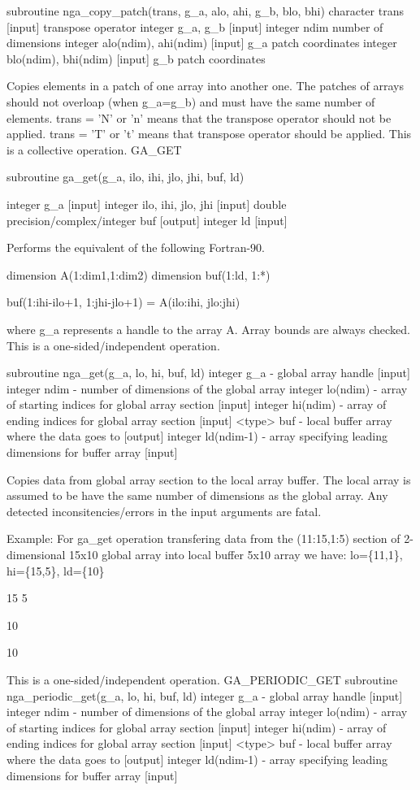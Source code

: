 subroutine nga\_copy\_patch(trans, g\_a, alo, ahi, g\_b, blo, bhi)
character trans {[}input{]} transpose operator integer g\_a, g\_b
{[}input{]} integer ndim number of dimensions integer alo(ndim), ahi(ndim)
{[}input{]} g\_a patch coordinates integer blo(ndim), bhi(ndim) {[}input{]}
g\_b patch coordinates

Copies elements in a patch of one array into another one. The patches
of arrays should not overloap (when g\_a=g\_b) and must have the same
number of elements. trans = 'N' or 'n' means that the transpose operator
should not be applied. trans = 'T' or 't' means that transpose operator
should be applied. This is a collective operation. GA\_GET

subroutine ga\_get(g\_a, ilo, ihi, jlo, jhi, buf, ld)

integer g\_a {[}input{]} integer ilo, ihi, jlo, jhi {[}input{]} double
precision/complex/integer buf {[}output{]} integer ld {[}input{]}

Performs the equivalent of the following Fortran-90.

dimension A(1:dim1,1:dim2) dimension buf(1:ld, 1:{*})

buf(1:ihi-ilo+1, 1:jhi-jlo+1) = A(ilo:ihi, jlo:jhi)

where g\_a represents a handle to the array A. Array bounds are always
checked. This is a one-sided/independent operation.

subroutine nga\_get(g\_a, lo, hi, buf, ld) integer g\_a - global array
handle {[}input{]} integer ndim - number of dimensions of the global
array integer lo(ndim) - array of starting indices for global array
section {[}input{]} integer hi(ndim) - array of ending indices for
global array section {[}input{]} <type> buf - local buffer array where
the data goes to {[}output{]} integer ld(ndim-1) - array specifying
leading dimensions for buffer array {[}input{]}

Copies data from global array section to the local array buffer. The
local array is assumed to be have the same number of dimensions as
the global array. Any detected inconsitencies/errors in the input
arguments are fatal.

Example: For ga\_get operation transfering data from the (11:15,1:5)
section of 2-dimensional 15x10 global array into local buffer 5x10
array we have: lo=\{11,1\}, hi=\{15,5\}, ld=\{10\} 

15 5 

10 

10 

This is a one-sided/independent operation. GA\_PERIODIC\_GET subroutine
nga\_periodic\_get(g\_a, lo, hi, buf, ld) integer g\_a - global array
handle {[}input{]} integer ndim - number of dimensions of the global
array integer lo(ndim) - array of starting indices for global array
section {[}input{]} integer hi(ndim) - array of ending indices for
global array section {[}input{]} <type> buf - local buffer array where
the data goes to {[}output{]} integer ld(ndim-1) - array specifying
leading dimensions for buffer array {[}input{]}

